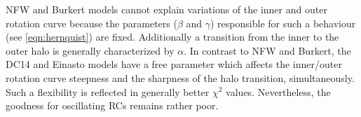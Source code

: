 NFW and Burkert models cannot explain variations of the inner and outer rotation curve because the parameters ($\beta$ and $\gamma$) responsible for such a behaviour (see \cref{eqn:hernquist}) are fixed. Additionally a transition from the inner to the outer halo is generally characterized by $\alpha$. In contrast to NFW and Burkert, the DC14 and Einasto models have a free parameter which affects the inner/outer rotation curve steepness and the sharpness of the halo transition, simultaneously. Such a flexibility is reflected in generally better $\chi^2$ values. Nevertheless, the goodness for oscillating RCs remains rather poor.
